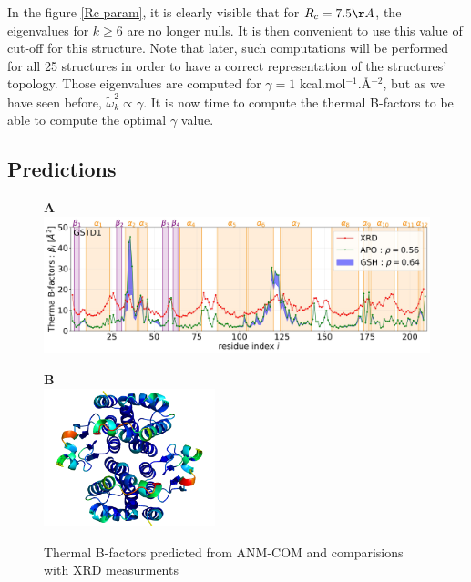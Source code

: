 \noindent In the figure \ref{Rc param}, it is clearly visible that for $R_c = 7.5\AA$, the eigenvalues for $k \ge 6$ are no longer nulls. It is then convenient to use this value of cut-off for this structure. Note that later, such computations will be performed for all 25 structures in order to have a correct representation of the structures' topology. Those eigenvalues are computed for $\gamma = 1$ kcal.mol$^{-1}$.\AA$^{-2}$, but as we have seen before, $\tilde{\omega}_k^2 \propto \gamma$. It is now time to compute the thermal B-factors to be able to compute the optimal $\gamma$ value.

\subsection{Predictions}
\begin{figure}[h!]
	\label{ANM-COM D1}
	\begin{minipage}{.68\linewidth}
		\textbf{A}\\
		\includegraphics[height = 4cm]{figures/GSTD1+GSH_ANM-COM_Bfactors.jpg}
	\end{minipage}
	\begin{minipage}{.30\linewidth}
		\textbf{B}\\
		\includegraphics[height = 4cm]{figures/GSTD1_ANM-COM_Bfactors_structure.png}
	\end{minipage}
	\caption{Thermal B-factors predicted from ANM-COM and comparisions with XRD measurments}
\end{figure}

